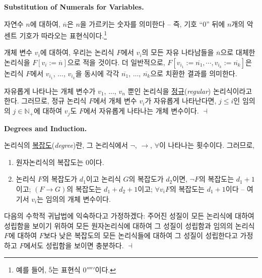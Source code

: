\documentclass[12pt]{paper}
\newenvironment{context}[1][]
{ \noindent \textbf{{#1}.}
}
{ \hfill $ \dashv $ }
\begin{document}
\begin{context}[Substitution of Numerals for Variables]
자연수 $n$에 대하여, $\overline{n}$은 $n$을 가르키는 숫자를 의미한다 --
즉, 기호 ``$0$'' 뒤에 $n$개의 악센트 기호가 따라오는 표현식이다.\footnote
{
예를 들어, $\overline{5}$는 표현식 $0'''''$이다.
}

개체 변수 $v_{i}$에 대하여, 우리는 논리식 $F$에서 $v_{i}$의 모든 자유 나타남들을 $\overline{n}$으로 대체한 논리식을 $F \left[ v_{i} := \overline{n} \right]$으로 적을 것이다.
더 일반적으로, $F \left[ v_{i_{1}} := \overline{n_{1}} , \cdots , v_{i_{k}} := \overline{n_{k}} \right]$은 논리식 $F$에서 $v_{i_{1}}$, ..., $v_{i_{k}}$을 동시에 각각 $\overline{n_{1}}$, ..., $\overline{n_{k}}$으로 치환한 결과를 의미한다.

자유롭게 나타나는 개체 변수가 $v_{1}$, ..., $v_{n}$ 뿐인 논리식을 \underline{정규}(\textit{regular}) 논리식이라고 한다.
그러므로, 정규 논리식 $F$에서 개체 변수 $v_{i}$가 자유롭게 나타난다면,
$j \leq i$인 임의의 $j \in \mathbb{N}_{+}$에 대하여 $v_{j}$도 $F$에서 자유롭게 나타나는 개체 변수이다.
\end{context}

\begin{context}[Degrees and Induction]
논리식의 \underline{복잡도}(\textit{degree})란, 그 논리식에서 $\lnot$, $\rightarrow$, $\forall$이 나타나는 횟수이다.
그러므로,
\begin{enumerate}
\item 원자논리식의 복잡도는 $0$이다.
\item 논리식 $F$의 복잡도가 $d_{1}$이고 논리식 $G$의 복잡도가 $d_{2}$이면,
$\lnot F$의 복잡도는 $d_{1} + 1$이고;
$\left( F \rightarrow G \right)$의 복잡도는 $d_{1} + d_{2} + 1$이고;
$\forall v_{i} F$의 복잡도는 $d_{1} + 1$이다 --
여기서 $v_{i}$는 임의의 개체 변수이다.
\end{enumerate}

다음의 수학적 귀납법에 익숙하다고 가정하겠다:
주어진 성질이 모든 논리식에 대하여 성립함을 보이기 위하여
모든 원자논리식에 대하여 그 성질이 성립함과
임의의 논리식 $F$에 대하여 $F$보다 낮은 복잡도의 모든 논리식들에 대하여 그 성질이 성립한다고 가정하고
$F$에서도 성립함을 보이면 충분하다.
\end{context}
\end{document}
